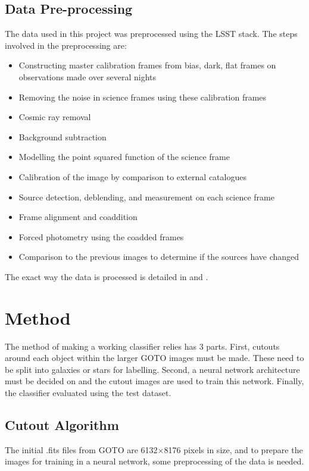 \documentclass[a4paper,fleqn,usenatbib]{mnras}
\begin{document}
\subsection{Data Pre-processing}
The data used in this project was preprocessed using the LSST stack. The steps involved in the preprocessing are:
\begin{itemize}
\item Constructing master calibration frames from bias, dark, flat frames on observations made over several nights
\item Removing the noise in science frames using these calibration frames
\item Cosmic ray removal
\item Background subtraction
\item Modelling the point squared function of the science frame
\item Calibration of the image by comparison to external catalogues
\item Source detection, deblending, and measurement on each science frame
\item Frame alignment and coaddition
\item Forced photometry using the coadded frames
\item Comparison to the previous images to determine if the sources have changed
\end{itemize}

The exact way the data is processed is detailed in \citet{Hypercam} and \citet{GOTOLSST}. 



 \section{Method}
The method of making a working classifier relies has 3 parts. First, cutouts around each object within the larger GOTO images must be made. These need to be split into galaxies or stars for labelling. Second, a neural network architecture must be decided on and the cutout images are used to train this network. Finally, the classifier evaluated using the test dataset.
\subsection{Cutout Algorithm}
The initial .fits files from GOTO are 6132$\times$8176 pixels in size, and to prepare the images for training in a neural network, some preprocessing of the data is needed. 
\end{document}
